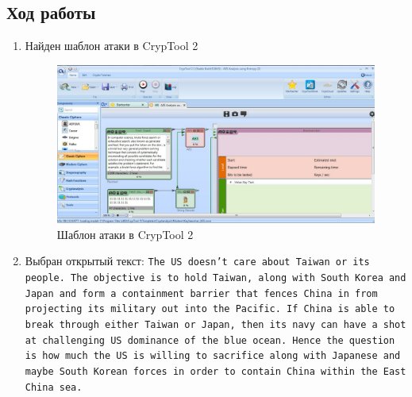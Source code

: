 \documentclass[a4paper, 14pt]{extarticle}
\begin{document}
\subsection{Ход работы}
\begin{enumerate}
    \item Найден шаблон атаки в CrypTool 2
        \begin{figure}[h]
            \centering
            \includegraphics[width=\textwidth]{img/S016.jpg}
            \caption{Шаблон атаки в CrypTool 2}%
            \label{img:c:1}
        \end{figure}
    \item Выбран открытый текст: \texttt{The US doesn't care about Taiwan or its people. The objective is to hold Taiwan, along with South Korea and Japan and form a containment barrier that fences China in from projecting its military out into the Pacific. If China is able to break through either Taiwan or Japan, then its navy can have a shot at challenging US dominance of the blue ocean. Hence the question is how much the US is willing to sacrifice along with Japanese and maybe South Korean forces in order to contain China within the East China sea.}


\end{enumerate}
\end{document}

